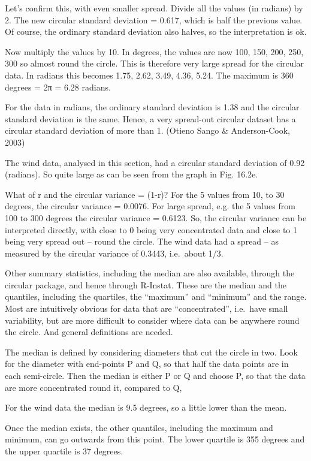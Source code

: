 \documentclass[
  letterpaper,
  DIV=11,
  numbers=noendperiod]{scrreprt}
\begin{document}
Let's confirm this, with even smaller spread. Divide all the values (in
radians) by 2. The new circular standard deviation = 0.617, which is
half the previous value. Of course, the ordinary standard deviation also
halves, so the interpretation is ok.

Now multiply the values by 10. In degrees, the values are now 100, 150,
200, 250, 300 so almost round the circle. This is therefore very large
spread for the circular data. In radians this becomes 1.75, 2.62, 3.49,
4.36, 5.24. The maximum is 360 degrees = 2π = 6.28 radians.

For the data in radians, the ordinary standard deviation is 1.38 and the
circular standard deviation is the same. Hence, a very spread-out
circular dataset has a circular standard deviation of more than 1.
(Otieno Sango \& Anderson-Cook, 2003)

The wind data, analysed in this section, had a circular standard
deviation of 0.92 (radians). So quite large as can be seen from the
graph in Fig. 16.2e.

What of r and the circular variance = (1-r)? For the 5 values from 10,
to 30 degrees, the circular variance = 0.0076. For large spread, e.g.
the 5 values from 100 to 300 degrees the circular variance = 0.6123. So,
the circular variance can be interpreted directly, with close to 0 being
very concentrated data and close to 1 being very spread out -- round the
circle. The wind data had a spread -- as measured by the circular
variance of 0.3443, i.e.~about 1/3.

Other summary statistics, including the median are also available,
through the circular package, and hence through R-Instat. These are the
median and the quantiles, including the quartiles, the ``maximum'' and
``minimum'' and the range. Most are intuitively obvious for data that
are ``concentrated'', i.e.~have small variability, but are more
difficult to consider where data can be anywhere round the circle. And
general definitions are needed.

The median is defined by considering diameters that cut the circle in
two. Look for the diameter with end-points P and Q, so that half the
data points are in each semi-circle. Then the median is either P or Q
and choose P, so that the data are more concentrated round it, compared
to Q,

For the wind data the median is 9.5 degrees, so a little lower than the
mean.

Once the median exists, the other quantiles, including the maximum and
minimum, can go outwards from this point. The lower quartile is 355
degrees and the upper quartile is 37 degrees.
\end{document}
